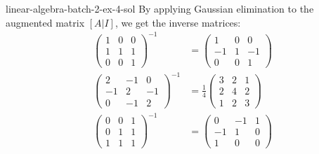 \documentclass[preview]{standalone}
\begin{document}
\begin{snippetsolution}{linear-algebra-batch-2-ex-4-sol}{}
    By applying Gaussian elimination to the augmented matrix \([A | I]\), we get the inverse matrices:
    \begin{align*}
        \begin{pmatrix}
            1 & 0 & 0 \\ 1 & 1 & 1 \\ 0 & 0 & 1
        \end{pmatrix}^{-1}
        &= \begin{pmatrix}
            1 & 0 & 0 \\ -1 & 1 & -1 \\ 0 & 0 & 1
        \end{pmatrix} \\
        \begin{pmatrix}
            2 & -1 & 0 \\ -1 & 2 & -1 \\ 0 & -1 & 2
        \end{pmatrix}^{-1}
        &= \frac{1}{4}\begin{pmatrix}
            3 & 2 & 1 \\ 2 & 4 & 2 \\ 1 & 2 & 3
        \end{pmatrix} \\
        \begin{pmatrix}
            0 & 0 & 1 \\ 0 & 1 & 1 \\ 1 & 1 & 1
        \end{pmatrix}^{-1}
        &= \begin{pmatrix}
            0 & -1 & 1 \\ -1 & 1 & 0 \\ 1 & 0 & 0
        \end{pmatrix}
    \end{align*}
\end{snippetsolution}
\end{document}
